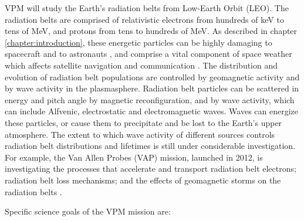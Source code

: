 VPM will study the Earth's radiation belts from Low-Earth Orbit (LEO). The radiation belts are comprised of relativistic electrons from hundreds of keV to tens of MeV, and protons from tens to hundreds of MeV. As described in chapter \ref{chapter:introduction}, these energetic particles can be highly damaging to spacecraft and to astronauts \citep[e.g.][]{Barth2003}, and comprise a vital component of space weather which affects satellite navigation and communication \citep{Bothmer:2007}. The distribution and evolution of radiation belt populations are controlled by geomagnetic activity and by wave activity in the plasmasphere. Radiation belt particles can be scattered in energy and pitch angle by magnetic reconfiguration, and by wave activity, which can include Alfvenic, electrostatic and electromagnetic waves. Waves can energize these particles, or cause them to precipitate and be lost to the Earth's upper atmosphere. The extent to which wave activity of different sources controls radiation belt distributions and lifetimes is still under considerable investigation. For example, the Van Allen Probes (VAP) mission, launched in 2012, is investigating the processes that accelerate and transport radiation belt electrons; radiation belt loss mechanisms; and the effects of geomagnetic storms on the radiation belts \citep{Spence2014}. %

Specific science goals of the VPM mission are:

